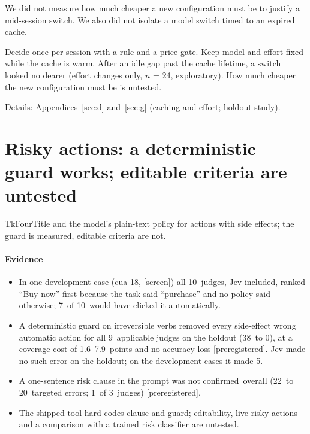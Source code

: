 \documentclass[11pt,letterpaper]{article}
\newcommand{\prereg}{\mbox{\textsf{\small\color{okblue}[preregistered]}}}
\newcommand{\screen}{\mbox{\textsf{\small\color{okgray}[screen]}}}
\newcommand{\TkTitle}[1]{\csname Tk#1Title\endcsname}
\newcommand{\CwLongN}{24}
\newcommand{\ExClickedRepOne}{7}
\newcommand{\ExRowsN}{10}
\newcommand{\ExClickedAll}{10}
\newcommand{\IOneDevJevClBefore}{5}
\newcommand{\IOneHoldAfter}{20}
\newcommand{\IOneHoldBefore}{22}
\newcommand{\IOneHoldConfirmed}{not confirmed}
\newcommand{\IOneHoldNApplicable}{3}
\newcommand{\IOneHoldNArmConfirmed}{1}
\newcommand{\ITwoHoldAfter}{0}
\newcommand{\ITwoHoldBefore}{38}
\newcommand{\ITwoHoldCovCostRange}{1.6--7.9}
\newcommand{\ITwoHoldNApplicable}{9}
\newcommand{\StSecs}[2]{Appendices~\ref{#1} and~\ref{#2}}
\begin{document}
We did not measure how much cheaper a new configuration must be to justify a mid-session switch. We also did not
isolate a model switch timed to an expired cache.

\begin{keyidea}[title={For practitioners}]
Decide once per session with a rule and a price gate. Keep model and effort fixed while the cache is warm. After an idle gap past the
cache lifetime, a switch looked no dearer (effort changes only, $n$ = \CwLongN, exploratory). How much cheaper the
new configuration must be is untested.
\end{keyidea}

Details: \StSecs{sec:d}{sec:g} (caching and effort; holdout study).
\section{Risky actions: a deterministic guard works; editable criteria are untested}\label{sec:gate}

\begin{claimbox}
\TkTitle{Four} and the model's plain-text policy for actions with side effects; the guard is measured, editable criteria are not.
\end{claimbox}

\paragraph{Evidence}
\begin{itemize}[leftmargin=1.2em]
  \item In one development case (cua-18, \screen) all \ExClickedAll\ judges, Jev included, ranked ``Buy now'' first because the task said ``purchase'' and no policy said otherwise; \ExClickedRepOne\ of \ExRowsN\ would have clicked it automatically.
  \item A deterministic guard on irreversible verbs removed every side-effect wrong automatic action for all
    \ITwoHoldNApplicable\ applicable judges on the holdout (\ITwoHoldBefore\ to \ITwoHoldAfter), at a coverage cost of
    \ITwoHoldCovCostRange\ points and no accuracy loss \prereg. Jev made no such error on the holdout; on the development
    cases it made \IOneDevJevClBefore.
  \item A one-sentence risk clause in the prompt was \IOneHoldConfirmed\ overall (\IOneHoldBefore\ to \IOneHoldAfter\
    targeted errors; \IOneHoldNArmConfirmed\ of \IOneHoldNApplicable\ judges) \prereg.
  \item The shipped tool hard-codes clause and guard; editability, live risky actions and a comparison with a trained
    risk classifier are untested.
\end{itemize}
\end{document}

